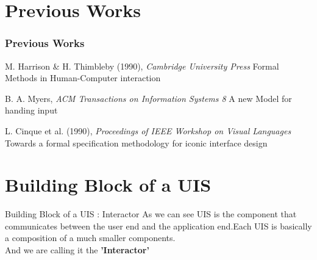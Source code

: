 \documentclass{beamer}
\begin{document}
	
	
	
	
	\section{Previous Works}
	\begin{frame}
		\frametitle{Previous Works}
		
			\begin{block}{M. Harrison \& H. Thimbleby (1990), \textit{Cambridge University Press}}
			Formal Methods in Human-Computer interaction
		\end{block}
	\pause
		\begin{block}{B. A. Myers, \textit{ACM Transactions on Information Systems 8}}
			A new Model for handing input
		\end{block}
		\pause
		\begin{block}{L. Cinque et al. (1990), \textit{Proceedings of IEEE Workshop on Visual Languages}}
			Towards a formal specification methodology for iconic interface design
		\end{block}
	\end{frame}


    	  	

\section{Building Block of a UIS}
\begin{frame}{Building Block of a UIS : Interactor}
	As we can see UIS is the component that communicates between the user end and the application end.Each UIS is basically a composition of a much smaller components.\\
	 And we are calling it the \textbf{'Interactor'}   
\end{frame}
\end{document}
